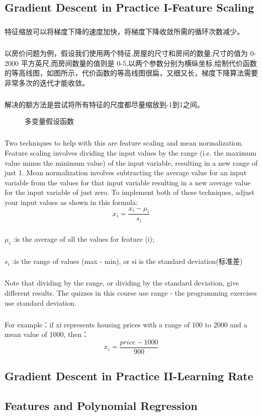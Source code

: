 \documentclass{article}
\begin{document}
\begin{CJK}{UTF8}{gbsn}
\subsection{Gradient Descent in Practice I-Feature Scaling}
\subparagraph*{}
特征缩放可以将梯度下降的速度加快，将梯度下降收敛所需的循环次数减少。
\subparagraph*{}
以房价问题为例，假设我们使用两个特征,房屋的尺寸和房间的数量,尺寸的值为 0-2000 平方英尺,而房间数量的值则是 0-5,以两个参数分别为横纵坐标,绘制代价函数的等高线图，如图所示，代价函数的等高线图很扁，又细又长，梯度下降算法需要非常多次的迭代才能收敛。
\subparagraph*{}
解决的额方法是尝试将所有特征的尺度都尽量缩放到-1到1之间。
\begin{figure}[H]
\caption{多变量假设函数}
\label{fig:224}
\end{figure}
\subparagraph*{}
Two techniques to help with this are feature scaling and mean normalization. Feature scaling involves dividing the input values by the range (i.e. the maximum value minus the minimum value) of the input variable, resulting in a new range of just 1. Mean normalization involves subtracting the average value for an input variable from the values for that input variable resulting in a new average value for the input variable of just zero. To implement both of these techniques, adjust your input values as shown in this formula:
\begin{equation}
x_i=\frac{x_i-\mu_i}{s_i}
\end{equation}
\subparagraph*{}
$\mu_i$ :is the average of all the values for feature (i);
\subparagraph*{}
$s_i$ :is the range of values (max - min), or si is the standard deviation(标准差)
\subparagraph*{}
Note that dividing by the range, or dividing by the standard deviation, give different results. The quizzes in this course use range - the programming exercises use standard deviation.
\subparagraph*{}
For example：if xi represents housing prices with a range of 100 to 2000 and a mean value of 1000, then：
\begin{equation}
x_i=\frac{price-1000}{900}
\end{equation}
\subsection{Gradient Descent in Practice II-Learning Rate}

\subsection{Features and Polynomial Regression}


\end{CJK}
\end{document}

